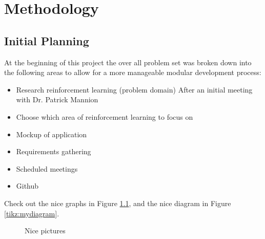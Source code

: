\chapter{Methodology}
\section{Initial Planning}
At the beginning of this project the over all problem set was broken down into the following areas to allow for a more manageable modular development process:
\begin{itemize}
\item Research reinforcement learning (problem domain)
After an initial meeting with Dr. Patrick Mannion 
\item Choose which area of reinforcement learning to focus on
\item Mockup of application
\item Requirements gathering
\item Scheduled meetings
\item Github 
\end{itemize}

Check out the nice graphs in Figure \ref{tikz:graphs}, and the nice diagram in Figure \ref{tikz:mydiagram}.

\begin{figure}
	\centering
	\hspace{1.5cm}
	\caption{Nice pictures}
	\label{tikz:graphs}
\end{figure}


